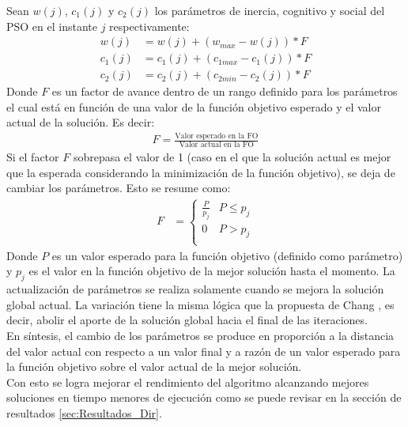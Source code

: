 Sean $w(j)$, $c_1(j)$ y $c_2(j)$ los parámetros de inercia, cognitivo y social del PSO en el instante $j$ respectivamente:  
\begin{align}\label{eq:VariationParameters_new}
    w(j) &= w(j) + (w_{max} - w(j)) * F \\
    c_{1}(j) &= c_1(j) + (c_{1max} - c_1(j)) * F \\
    c_{2}(j) &= c_2(j) + (c_{2min} - c_2(j)) * F
\end{align} 
Donde $F$ es un factor de avance dentro de un rango definido para los parámetros el cual está en función de una valor de la función objetivo esperado y el valor actual de la solución. Es decir: 
\begin{align}
  F = \frac{\text{Valor esperado en la FO}}{\text{Valor actual en la FO}}
\end{align}
Si el factor $F$ sobrepasa el valor de 1 (caso en el que la solución actual es mejor que la esperada considerando la minimización de la función objetivo), se deja de cambiar los parámetros. Esto se resume como:
\begin{align}\label{eq:restriction_var_par_new}
    F &= 
        \left\{
            \begin{array}{ll}
                \frac{P}{p_j}  & P \leq p_j\\
                0 & P > p_j\\
            \end{array}
        \right.
\end{align}
Donde $P$ es un valor esperado para la función objetivo (definido como parámetro) y $p_j$ es el valor en la función objetivo de la mejor solución hasta el momento. La actualización de parámetros se realiza solamente cuando se mejora la solución global actual. La variación tiene la misma lógica que la propuesta de Chang \cite{Chang10_2}, es decir, abolir el aporte de la solución global hacia el final de las iteraciones.\\
En síntesis, el cambio de los parámetros se produce en proporción a la distancia del valor actual con respecto a un valor final y a razón de un valor esperado para la función objetivo sobre el valor actual de la mejor solución.\\
 Con esto se logra mejorar el rendimiento del algoritmo alcanzando mejores soluciones en tiempo menores de ejecución como se puede revisar en la sección de resultados \ref{sec:Resultados_Dir}.

